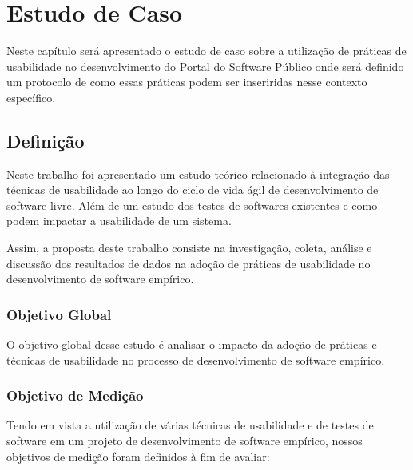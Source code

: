 \chapter{Estudo de Caso}


Neste capítulo será apresentado o estudo de caso sobre a utilização de práticas de usabilidade no desenvolvimento do Portal do Software Público onde será definido um protocolo de como essas práticas podem ser inseriridas nesse contexto específico.


%


\section{Definição}
Neste trabalho foi apresentado um estudo teórico relacionado à integração das técnicas de usabilidade ao longo do ciclo de vida ágil de desenvolvimento de software livre. Além de um estudo dos testes de softwares existentes e como podem impactar a usabilidade de um sistema.


Assim, a proposta deste trabalho consiste na investigação, coleta, análise e discussão dos resultados de dados na adoção de práticas de usabilidade no desenvolvimento de software empírico.

\subsection{Objetivo Global}

O objetivo global desse estudo é analisar o impacto da adoção de práticas e técnicas de usabilidade no processo de desenvolvimento de software empírico.


\subsection{Objetivo de Medição}

Tendo em vista a utilização de várias técnicas de usabilidade e de testes de software em um projeto de desenvolvimento de software empírico, nossos objetivos de medição foram definidos à fim de avaliar:

